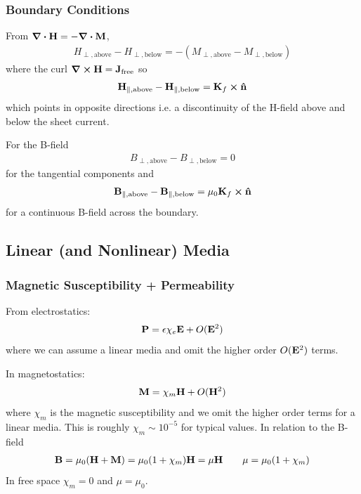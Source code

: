 \documentclass[../main.tex]{subfiles}
\begin{document}
\subsubsection{Boundary Conditions}
From $\div \vb H = - \div \vb M$,
\begin{align*}
    H_{\perp, \text{above}} - H_{\perp, \text{below}} = -(M_{\perp, \text{above}} - M_{\perp, \text{below}})
\end{align*}
where the curl $\curl \vb H = \vb J_\text{free}$ so
\begin{align*}
    \vb H_{\parallel, \text{above}} - \vb H_{\parallel, \text{below}} = \vb K_f \cross \vu n
\end{align*}
which points in opposite directions i.e. a discontinuity of the H-field above and below the sheet current.

For the B-field
\begin{align*}
    B_{\perp, \text{above}} - B_{\perp, \text{below}} = 0
\end{align*}
for the tangential components and
\begin{align*}
    \vb B_{\parallel, \text{above}} - \vb B_{\parallel, \text{below}} = \mu_0 \vb K_f \cross \vu n
\end{align*}
for a continuous B-field across the boundary.

\subsection{Linear (and Nonlinear) Media}

\subsubsection{Magnetic Susceptibility + Permeability}
From electrostatics:
\begin{align*}
    \vb P = \epsilon \chi_e \vb E + O(\vb E^2)
\end{align*}
where we can assume a linear media and omit the higher order $O(\vb E^2)$ terms.

In magnetostatics:
\begin{align*}
    \vb M = \chi_m \vb H + O(\vb H^2)
\end{align*}
where $\chi_m$ is the magnetic susceptibility and we omit the higher order terms for a linear media.
This is roughly $\chi_m \sim 10^{-5}$ for typical values. In relation to the B-field
\begin{align*}
    \vb B = \mu_0 (\vb H + \vb M) = \mu_0 (1 + \chi_m) \vb H = \mu \vb H \qquad \mu = \mu_0 (1 + \chi_m)
\end{align*}
In free space $\chi_m = 0$ and $\mu = \mu_0$.
\end{document}
